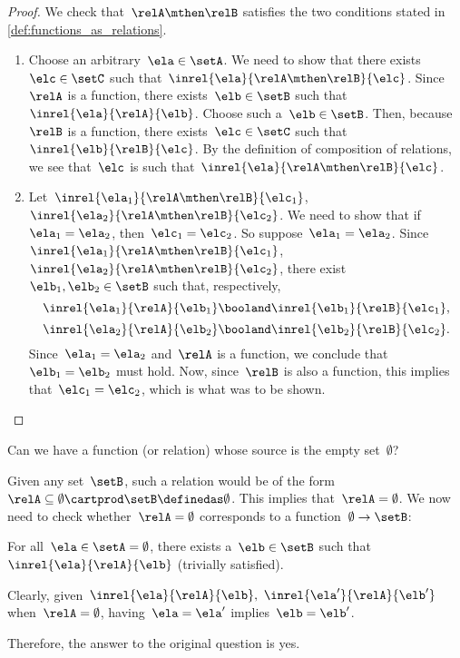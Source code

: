 \begin{proof}
    We check that~$\relA \mthen \relB$ satisfies the two conditions stated in \cref{def:functions_as_relations}.

    \begin{enumerate}
        \item Choose an arbitrary~$\ela \in \setA$.
              We need to show that there exists~$\elc \in \setC$ such that~$\inrel{\ela}{\relA \mthen \relB}{\elc}$.
              Since~$\relA$ is a function, there exists~$\elb \in \setB$ such that~$\inrel{\ela}{\relA}{\elb}$.
              Choose such a~$\elb \in \setB$.
              Then, because~$\relB$ is a function, there exists~$\elc \in \setC$ such that~$\inrel{\elb}{\relB}{\elc}$.
              By the definition of composition of relations, we see that~$\elc$ is such that~$\inrel{\ela}{\relA \mthen \relB}{\elc}$.
        \item Let~$\inrel{\ela_1}{\relA \mthen \relB}{\elc_1}$,~$\inrel{\ela_2}{\relA \mthen \relB}{\elc_2}$.
              We need to show that if~$\ela_1 = \ela_2$, then~$\elc_1 = \elc_2$.
              So suppose~$\ela_1 = \ela_2$.
              Since~$\inrel{\ela_1}{\relA \mthen \relB}{\elc_1}$,~$\inrel{\ela_2}{\relA \mthen \relB}{\elc_2}$, there exist~$\elb_1, \elb_2 \in \setB$ such that, respectively,
              \begin{equation*}
                  \inrel{\ela_1}{\relA}{\elb_1} \booland \inrel{\elb_1}{\relB}{\elc_1},
              \end{equation*}
              \begin{equation*}
                  \inrel{\ela_2}{\relA}{\elb_2} \booland \inrel{\elb_2}{\relB}{\elc_2}.
              \end{equation*}
              Since~$\ela_1 = \ela_2$ and~$\relA$ is a function, we conclude that~$\elb_1 = \elb_2$ must hold.
              Now, since~$\relB$ is also a function, this implies that~$\elc_1 = \elc_2$, which is what was to be shown.
    \end{enumerate}
\end{proof}

\begin{exercise}
    Can we have a function (or relation) whose source is the empty set~$\emptyset$?
\end{exercise}
\begin{solution}
    Given any set~$\setB$, such a relation would be of the form~$\relA \subseteq \emptyset \cartprod \setB \definedas \emptyset$.
    This implies that~$\relA=\emptyset$.
    We now need to check whether~$\relA=\emptyset$ corresponds to a function~$\emptyset\to \setB$:
    \begin{compactitem}
        \item For all~$\ela\in \setA=\emptyset$, there exists a~$\elb \in \setB$ such that $\inrel{\ela}{\relA}{\elb}$ (trivially satisfied).
        \item Clearly, given~$\inrel{\ela}{\relA}{\elb},~\inrel{\ela'}{\relA}{\elb'}$ when~$\relA=\emptyset$, having~$\ela=\ela'$ implies~$\elb=\elb'$.
    \end{compactitem}
    Therefore, the answer to the original question is yes.
\end{solution}

